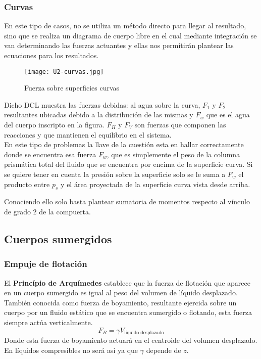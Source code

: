\subsubsection{Curvas}
En este tipo de casos, no se utiliza un método directo para llegar al resultado, sino que se realiza un diagrama de cuerpo libre en el cual mediante integración se van determinando las fuerzas actuantes y ellas nos permitirán plantear las ecuaciones para los resultados.
\begin{figure}[h]
	\centering
	\texttt{[image: U2-curvas.jpg]}
	\caption{Fuerza sobre superficies curvas}
	\label{fig:fuerz-sup-curv}
\end{figure}
Dicho DCL muestra las fuerzas debidas: al agua sobre la curva, $F_{1}$ y $F_{2}$ resultantes ubicadas debido a la distribución de las mismas y $F_{w}$ que es el agua del cuerpo inscripto en la figura. $F_{H}$ y $F_{V}$ son fuerzas que componen las reacciones y que mantienen el equilibrio en el sistema.\\
En este tipo de problemas la llave de la cuestión esta en hallar correctamente donde se encuentra esa fuerza $F_{w}$, que es simplemente el peso de la columna prismática total del fluido que se encuentra por encima de la superficie curva. Si se quiere tener en cuenta la presión sobre la superficie solo se le suma a $F_{w}$ el producto entre $p_{s}$ y el área proyectada de la superficie curva vista desde arriba.

Conociendo ello solo basta plantear sumatoria de momentos respecto al vínculo de grado 2 de la compuerta.

\subsection{Cuerpos sumergidos}
\subsubsection{Empuje de flotación}
El \textbf{Princípio de Arquímedes} establece que la fuerza de flotación que aparece en un cuerpo sumergido es igual al peso del volumen de líquido desplazado.\\
También conocida como fuerza de boyamiento, resultante ejercida sobre un cuerpo por un fluido estático que se encuentra sumergido o flotando, esta fuerza siempre actúa verticalmente.
\begin{equation}
	F_{B}=\gamma V_{\text{líquido desplazado}}
	\label{ec:fuerz-boy}
\end{equation}
Donde esta fuerza de boyamiento actuará en el centroide del volumen desplazado. En líquidos compresibles no será asi ya que $\gamma$ depende de $z$.

